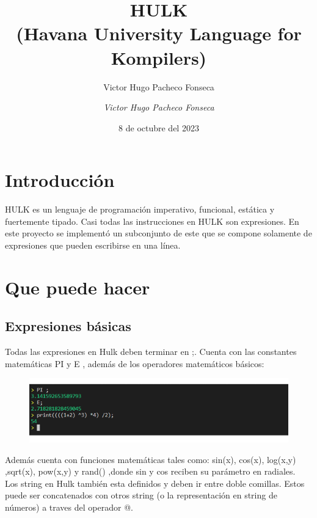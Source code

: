 \documentclass[12pt]{article}
\author{Victor Hugo Pacheco Fonseca}
\begin{document}
	
	\title{\Huge{\textbf{HULK }}\\
		{\Large{{(Havana University Language for Kompilers)}}}}
	
	
	\author{\textit{Victor Hugo Pacheco Fonseca}}
	\date{8 de octubre del 2023}
	
	
	\maketitle
	\newpage
	
	\section{\Huge {Introducción}}	
	HULK es un lenguaje de programación imperativo, funcional, estática y fuertemente tipado. Casi todas las instrucciones en HULK son expresiones. En este proyecto se implementó un subconjunto de este  que se compone solamente de expresiones que pueden escribirse en una línea.
	
	
	\newpage
	\section{\Huge {Que puede hacer}}	
	\subsection{Expresiones básicas}
	Todas las expresiones en Hulk deben terminar en ;. Cuenta con las constantes matemáticas  PI y E , además de los operadores matemáticos básicos:
	
	\begin{center}
		\begin{figure}[h!]
			\centering
			\includegraphics[scale=0.3]{imagen4}
		\end{figure}
	\end{center}
	
	
	Además cuenta con funciones matemáticas tales como:
	sin(x), cos(x), log(x,y) ,sqrt(x), pow(x,y) y rand() ,donde  sin y cos reciben su parámetro en radiales.\\
	Los string en Hulk también esta definidos y deben ir entre doble comillas. Estos puede ser concatenados con otros string (o la representación en string de números)  a traves del operador @.
	
\end{document}

